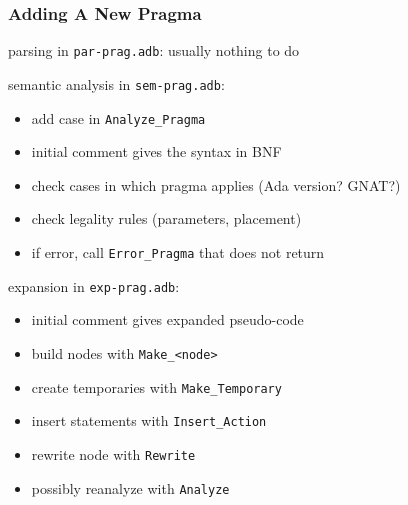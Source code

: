 \documentclass{beamer}
\newcommand{\vs}{\vspace{0.5cm}}
\newenvironment{specialframe}{%
  \begin{frame}[fragile,environment=specialframe]}{\end{frame}}
\begin{document}
\begin{specialframe}
  \frametitle{Adding A New Pragma}

parsing in \verb|par-prag.adb|: usually nothing to do

\vs

semantic analysis in \verb|sem-prag.adb|:
\begin{itemize}
\item add case in \verb|Analyze_Pragma|
\item initial comment gives the syntax in BNF
\item check cases in which pragma applies (Ada version? GNAT?)
\item check legality rules (parameters, placement)
\item if error, call \verb|Error_Pragma| that does not return
\end{itemize}

\vs

expansion in \verb|exp-prag.adb|:
\begin{itemize}
\item initial comment gives expanded pseudo-code
\item build nodes with \verb|Make_<node>|
\item create temporaries with \verb|Make_Temporary|
\item insert statements with \verb|Insert_Action|
\item rewrite node with \verb|Rewrite|
\item possibly reanalyze with \verb|Analyze|
\end{itemize}

\end{specialframe}

\begin{specialframe}
  \frametitle{}

\end{specialframe}

\begin{specialframe}
  \frametitle{}

\end{specialframe}

\begin{specialframe}
  \frametitle{}

\end{specialframe}
\end{document}
